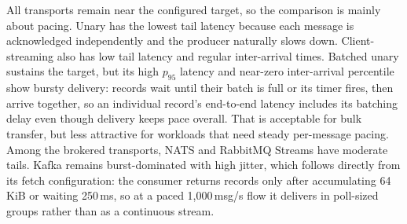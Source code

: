 \begin{table}[!htbp]
    \centering
    \scriptsize
    \caption{Continuous steady-rate scenario: single-node results averaged over ten repetitions (1\,KiB payload, 1{,}000 msg/s target). Throughput in msg/s; latency, inter-arrival, and jitter values in milliseconds.}
    \label{tab:grpc-continuous-results}
    \setlength{\tabcolsep}{3pt}
\end{table}

All transports remain near the configured target, so the comparison is mainly about pacing. Unary has the lowest tail latency because each message is acknowledged independently and the producer naturally slows down. Client-streaming also has low tail latency and regular inter-arrival times. Batched unary sustains the target, but its high $p_{95}$ latency and near-zero inter-arrival percentile show bursty delivery: records wait until their batch is full or its timer fires, then arrive together, so an individual record's end-to-end latency includes its batching delay even though delivery keeps pace overall. That is acceptable for bulk transfer, but less attractive for workloads that need steady per-message pacing. Among the brokered transports, NATS and RabbitMQ Streams have moderate tails. Kafka remains burst-dominated with high jitter, which follows directly from its fetch configuration: the consumer returns records only after accumulating 64\,KiB or waiting 250\,ms, so at a paced 1{,}000\,msg/s flow it delivers in poll-sized groups rather than as a continuous stream.

